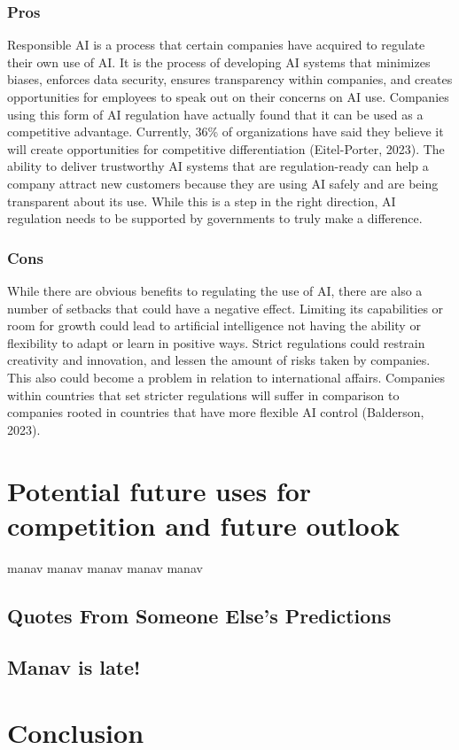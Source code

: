 \documentclass[
]{book}
\begin{document}
\hypertarget{pros}{%
\subsection{Pros}\label{pros}}

Responsible AI is a process that certain companies have acquired to regulate their own use of AI. It is the process of developing AI systems that minimizes biases, enforces data security, ensures transparency within companies, and creates opportunities for employees to speak out on their concerns on AI use. Companies using this form of AI regulation have actually found that it can be used as a competitive advantage. Currently, 36\% of organizations have said they believe it will create opportunities for competitive differentiation (Eitel-Porter, 2023). The ability to deliver trustworthy AI systems that are regulation-ready can help a company attract new customers because they are using AI safely and are being transparent about its use. While this is a step in the right direction, AI regulation needs to be supported by governments to truly make a difference.

\hypertarget{cons}{%
\subsection{Cons}\label{cons}}

While there are obvious benefits to regulating the use of AI, there are also a number of setbacks that could have a negative effect. Limiting its capabilities or room for growth could lead to artificial intelligence not having the ability or flexibility to adapt or learn in positive ways. Strict regulations could restrain creativity and innovation, and lessen the amount of risks taken by companies. This also could become a problem in relation to international affairs. Companies within countries that set stricter regulations will suffer in comparison to companies rooted in countries that have more flexible AI control (Balderson, 2023).

\hypertarget{potential-future-uses-for-competition-and-future-outlook}{%
\chapter{Potential future uses for competition and future outlook}\label{potential-future-uses-for-competition-and-future-outlook}}

manav manav manav manav manav

\hypertarget{quotes-from-someone-elses-predictions}{%
\section{Quotes From Someone Else's Predictions}\label{quotes-from-someone-elses-predictions}}

\hypertarget{manav-is-late}{%
\section{Manav is late!}\label{manav-is-late}}

\hypertarget{conclusion}{%
\chapter{Conclusion}\label{conclusion}}

  
\end{document}
